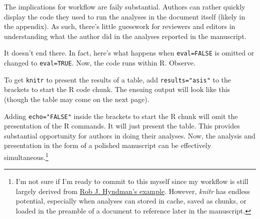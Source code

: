 \documentclass[11pt,]{article}
\newenvironment{Shaded}{\begin{snugshade}}{\end{snugshade}}
\newcommand{\KeywordTok}[1]{\textcolor[rgb]{0.13,0.29,0.53}{\textbf{#1}}}
\newcommand{\DataTypeTok}[1]{\textcolor[rgb]{0.13,0.29,0.53}{#1}}
\newcommand{\StringTok}[1]{\textcolor[rgb]{0.31,0.60,0.02}{#1}}
\newcommand{\OperatorTok}[1]{\textcolor[rgb]{0.81,0.36,0.00}{\textbf{#1}}}
\newcommand{\NormalTok}[1]{#1}
\begin{document}
\begin{Shaded}
\end{Shaded}

The implications for workflow are faily substantial. Authors can rather
quickly display the code they used to run the analyses in the document
itself (likely in the appendix). As such, there's little guesswork for
reviewers and editors in understanding what the author did in the
analyses reported in the manuscript.

It doesn't end there. In fact, here's what happens when
\texttt{eval=FALSE} is omitted or changed to \texttt{eval=TRUE}. Now,
the code runs within R. Observe.

To get \texttt{knitr} to present the results of a table, add
\texttt{results="asis"} to the brackets to start the R code chunk. The
ensuing output will look like this (though the table may come on the
next page).

Adding \texttt{echo="FALSE"} inside the brackets to start the R chunk
will omit the presentation of the R commands. It will just present the
table. This provides substantial opportunity for authors in doing their
analyses. Now, the analysis and presentation in the form of a polished
manuscript can be effectively simultaneous.\footnote{I'm not sure if I'm
  ready to commit to this myself since my workflow is still largely
  derived from
  \href{http://robjhyndman.com/hyndsight/workflow-in-r/}{Rob J.
  Hyndman's example}. However, \emph{knitr} has endless potential,
  especially when analyses can stored in cache, saved as chunks, or
  loaded in the preamble of a document to reference later in the
  manuscript.}

\newpage
\singlespacing 
\end{document}
